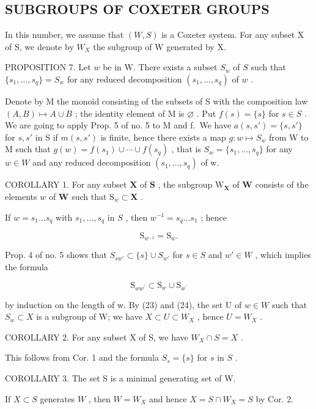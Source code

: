 \subsection{SUBGROUPS OF COXETER GROUPS}

In this number, we assume that \((W, S)\) is a Coxeter system. For any subset X of S, we denote by \(W_{X}\) the subgroup of W generated by X.

PROPOSITION 7. Let \(w\) be in W. There exists a subset \(S_w\) of \(S\) such that \(\{s_1, \ldots, s_q\} = S_w\) for any reduced decomposition \((s_1, \ldots, s_q)\) of \(w\) .

Denote by M the monoid consisting of the subsets of S with the composition law \((A,B)\mapsto A\cup B\) ; the identity element of M is \(\varnothing\) . Put \(f(s)=\{s\}\) for \(s\in S\) . We are going to apply Prop. 5 of no. 5 to M and f.~We have \(a(s,s')=\{s,s'\}\) for \(s,s'\) in S if \(m(s,s')\) is finite, hence there exists a map \(g:w\mapsto S_w\) from W to M such that \(g(w)=f(s_1)\cup\cdots\cup f(s_q)\) , that is \(S_w=\{s_1,\ldots,s_q\}\) for any \(w\in W\) and any reduced decomposition \((s_1,\ldots,s_q)\) of w.

COROLLARY 1. For any subset \(\mathbf{X}\) of \(\mathbf{S}\) , the subgroup \(\mathrm{W}_{\mathbf{X}}\) of \(\mathbf{W}\) consists of the elements \(w\) of \(\mathbf{W}\) such that \(\mathrm{S}_w \subset \mathbf{X}\) .

If \(w = s_1 \ldots s_q\) with \(s_1, \ldots, s_q\) in \(S\) , then \(w^{-1} = s_q \ldots s_1\) ; hence

\[
\mathrm{S} _ {w ^ {- 1}} = \mathrm{S} _ {w}.\tag{23}
\]

Prop. 4 of no. 5 shows that \(S_{sw'} \subset \{s\} \cup S_{w'}\) for \(s \in S\) and \(w' \in W\) , which implies the formula

\[
\mathrm{S} _ {w w ^ {\prime}} \subset \mathrm{S} _ {w} \cup \mathrm{S} _ {w ^ {\prime}}\tag{24}
\]

by induction on the length of w. By (23) and (24), the set U of \(w \in W\) such that \(S_{w} \subset X\) is a subgroup of W; we have \(X \subset U \subset W_{X}\) , hence \(U = W_{X}\) .

COROLLARY 2. For any subset X of S, we have \(W_{X} \cap S = X\) .

This follows from Cor. 1 and the formula \(S_s = \{s\}\) for \(s\) in \(S\) .

COROLLARY 3. The set S is a minimal generating set of W.

If \(X \subset S\) generates \(W\) , then \(W = W_X\) and hence \(X = S \cap W_X = S\) by Cor. 2.

